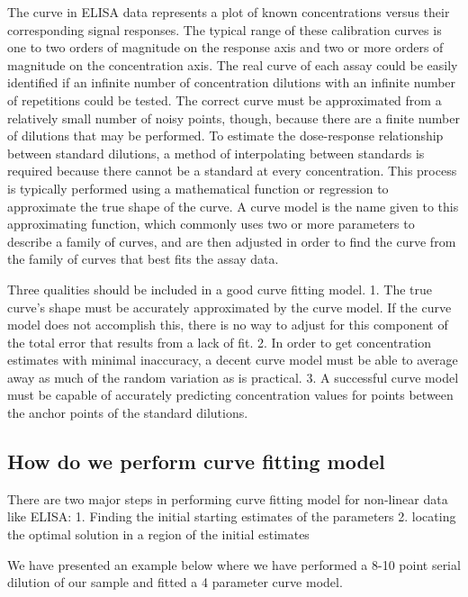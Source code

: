 \documentclass[
]{book}
\begin{document}
The curve in ELISA data represents a plot of known concentrations versus their corresponding signal responses. The typical range of these calibration curves is one to two orders of magnitude on the response axis and two or more orders of magnitude on the concentration axis. The real curve of each assay could be easily identified if an infinite number of concentration dilutions with an infinite number of repetitions could be tested. The correct curve must be approximated from a relatively small number of noisy points, though, because there are a finite number of dilutions that may be performed. To estimate the dose-response relationship between standard dilutions, a method of interpolating between standards is required because there cannot be a standard at every concentration. This process is typically performed using a mathematical function or regression to approximate the true shape of the curve. A curve model is the name given to this approximating function, which commonly uses two or more parameters to describe a family of curves, and are then adjusted in order to find the curve from the family of curves that best fits the assay data.

Three qualities should be included in a good curve fitting model.
1. The true curve's shape must be accurately approximated by the curve model. If the curve model does not accomplish this, there is no way to adjust for this component of the total error that results from a lack of fit.
2. In order to get concentration estimates with minimal inaccuracy, a decent curve model must be able to average away as much of the random variation as is practical. 3. A successful curve model must be capable of accurately predicting concentration values for points between the anchor points of the standard dilutions.

\hypertarget{how-do-we-perform-curve-fitting-model}{%
\subsection{How do we perform curve fitting model}\label{how-do-we-perform-curve-fitting-model}}

There are two major steps in performing curve fitting model for non-linear data like ELISA:
1. Finding the initial starting estimates of the parameters
2. locating the optimal solution in a region of the initial estimates

We have presented an example below where we have performed a 8-10 point serial dilution of our sample and fitted a 4 parameter curve model.
\end{document}
